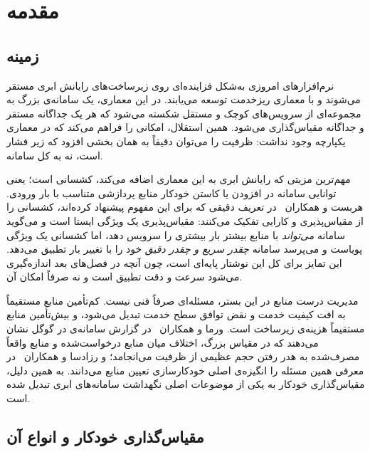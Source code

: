 \chapter{مقدمه}
\label{ch:intro}

\section{زمینه}
\label{sec:intro-background}

نرم‌افزارهای امروزی به‌شکل فزاینده‌ای روی زیرساخت‌های رایانش ابری
مستقر می‌شوند و با معماری ریزخدمت توسعه می‌یابند. در این معماری،
یک سامانه‌ی بزرگ به مجموعه‌ای از سرویس‌های کوچک و مستقل شکسته می‌شود که هر یک جداگانه مستقر و
جداگانه مقیاس‌گذاری می‌شود. همین استقلال، امکانی را فراهم می‌کند که در معماری یکپارچه وجود
نداشت: ظرفیت را می‌توان دقیقاً به همان بخشی افزود که زیر فشار است، نه به کل سامانه.

مهم‌ترین مزیتی که رایانش ابری به این معماری اضافه می‌کند، کشسانی
است؛ یعنی توانایی سامانه در افزودن یا کاستن خودکار منابع پردازشی متناسب با بار ورودی. هربست و
همکاران~\cite{herbst2013} در تعریف دقیقی که برای این مفهوم پیشنهاد کرده‌اند، کشسانی را از
مقیاس‌پذیری و کارایی تفکیک می‌کنند:
مقیاس‌پذیری یک ویژگی ایستا است و می‌گوید سامانه \emph{می‌تواند} با منابع بیشتر بار بیشتری را
سرویس دهد، اما کشسانی یک ویژگی پویاست و می‌پرسد سامانه \emph{چقدر سریع و چقدر دقیق} خود را با
تغییر بار تطبیق می‌دهد. این تمایز برای کل این نوشتار پایه‌ای است، چون آنچه در فصل‌های بعد
اندازه‌گیری می‌شود سرعت و دقت تطبیق است و نه صرفاً امکان آن.

مدیریت درست منابع در این بستر، مسئله‌ای صرفاً فنی نیست. کم‌تأمین منابع مستقیماً به افت کیفیت
خدمت و نقض توافق سطح خدمت تبدیل می‌شود، و بیش‌تأمین منابع مستقیماً هزینه‌ی زیرساخت است. ورما و
همکاران~\cite{verma2015} در گزارش سامانه‌ی  در گوگل نشان می‌دهند که در مقیاس بزرگ،
اختلاف میان منابع درخواست‌شده و منابع واقعاً مصرف‌شده به هدر رفتن حجم عظیمی از ظرفیت می‌انجامد؛
و رزادسا و همکاران~\cite{rzadca2020} در معرفی  همین مسئله را انگیزه‌ی اصلی
خودکارسازی تعیین منابع می‌دانند. به همین دلیل، مقیاس‌گذاری خودکار به
یکی از موضوعات اصلی نگهداشت سامانه‌های ابری تبدیل شده است.

\section{مقیاس‌گذاری خودکار و انواع آن}
\label{sec:intro-autoscaling}

